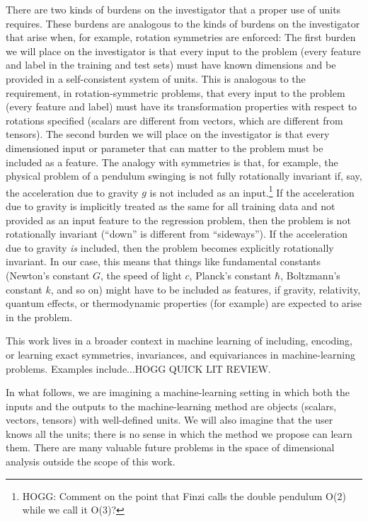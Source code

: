 \documentclass[12pt, letterpaper]{article}
\begin{document}
There are two kinds of burdens on the investigator that a proper use of units requires.
These burdens are analogous to the kinds of burdens on the investigator that arise when, for example, rotation symmetries are enforced:
The first burden we will place on the investigator is that every input to the problem (every feature and label in the training and test sets) must have known dimensions and be provided in a self-consistent system of units.
This is analogous to the requirement, in rotation-symmetric problems, that every input to the problem (every feature and label) must have its transformation properties with respect to rotations specified (scalars are different from vectors, which are different from tensors).
The second burden we will place on the investigator is that every dimensioned input or parameter that can matter to the problem must be included as a feature.
The analogy with symmetries is that, for example, the physical problem of a pendulum swinging is not fully rotationally invariant if, say, the acceleration due to gravity $g$ is not included as an input.\footnote{HOGG: Comment on the point that Finzi \cite{finzi} calls the double pendulum O(2) while we \cite{yao} call it O(3)?}
If the acceleration due to gravity is implicitly treated as the same for all training data and not provided as an input feature to the regression problem, then the problem is not rotationally invariant (``down'' is different from ``sideways'').
If the acceleration due to gravity \emph{is} included, then the problem becomes explicitly rotationally invariant.
In our case, this means that things like fundamental constants (Newton's constant $G$, the speed of light $c$, Planck's constant $\hbar$, Boltzmann's constant $k$, and so on) might have to be included as features, if gravity, relativity, quantum effects, or thermodynamic properties (for example) are expected to arise in the problem.

This work lives in a broader context in machine learning of including, encoding, or learning exact symmetries, invariances, and equivariances in machine-learning problems.
Examples include...HOGG QUICK LIT REVIEW.

In what follows, we are imagining a machine-learning setting in which both the inputs and the outputs to the machine-learning method are objects (scalars, vectors, tensors) with well-defined units.
We will also imagine that the user knows all the units; there is no sense in which the method we propose can learn them.
There are many valuable future problems in the space of dimensional analysis outside the scope of this work.
\end{document}
